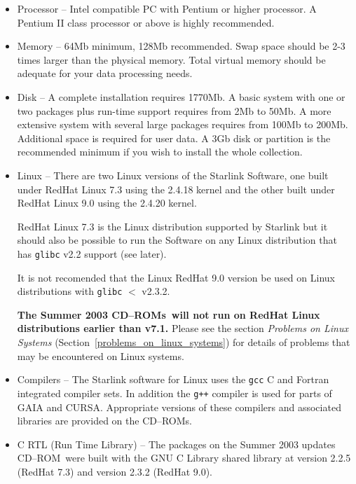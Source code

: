 \documentclass[twoside,11pt]{article}
\newcommand{\htmlref}[2]{#1}
\newcommand{\latex}[1]{#1}
\renewcommand{\_}{\texttt{\symbol{95}}}
\newcommand{\cdrom}{CD--ROM}
\newcommand{\cdrom}{CD-ROM}
\newcommand{\cdroms}{CD--ROMs}
\newcommand{\cdroms}{CD-ROMs}
\newcommand{\rhafull}{1770Mb}
\begin{document}
\begin{itemize}

\item Processor -- Intel compatible PC with Pentium or higher
processor.  A Pentium II class processor or above is highly recommended.

\item Memory -- 64Mb minimum, 128Mb recommended.  Swap space should be
2-3 times larger than the physical memory. Total virtual memory should be 
adequate for your data processing needs.

\item Disk -- A complete installation requires \rhafull.
A basic system with one or two packages plus run-time support requires
from 2Mb to 50Mb.  A more extensive system with several large packages
requires from 100Mb to 200Mb.   Additional space is required for user
data.  A 3Gb disk or partition is the recommended minimum if you wish
to install the whole collection.

\item Linux -- There are two Linux versions of the Starlink Software, 
one built under RedHat Linux 7.3 using the 2.4.18 kernel and the other 
built under RedHat Linux 9.0 using the 2.4.20 kernel.

RedHat Linux 7.3 is the Linux distribution supported by Starlink but it
should also be possible to run the Software on any Linux distribution
that has \texttt{glibc} v2.2 support (see later).

It is not recomended that the Linux RedHat 9.0 version be used
on Linux distributions with  \texttt{glibc} $<$ v2.3.2.

\textbf{The Summer 2003 \cdroms\ will not run on RedHat Linux
distributions earlier than v7.1.} Please see the section
\htmlref{\textit{Problems on Linux Systems}}{problems_on_linux_systems}
\latex{(Section~\ref{problems_on_linux_systems})} for details of problems
that may be encountered on Linux systems.

\item Compilers -- The Starlink software for Linux uses the
\texttt{gcc} C and Fortran integrated compiler sets.  In addition the
\texttt{g++} compiler is used for parts of GAIA and CURSA.  Appropriate
versions of these compilers and associated libraries are provided on
the \cdroms.

\item C RTL (Run Time Library) -- The packages on the Summer 2003
updates \cdrom\ were built with the GNU C Library shared library at
version 2.2.5 (RedHat 7.3) and version 2.3.2 (RedHat 9.0).

\end{itemize}
\end{document}
